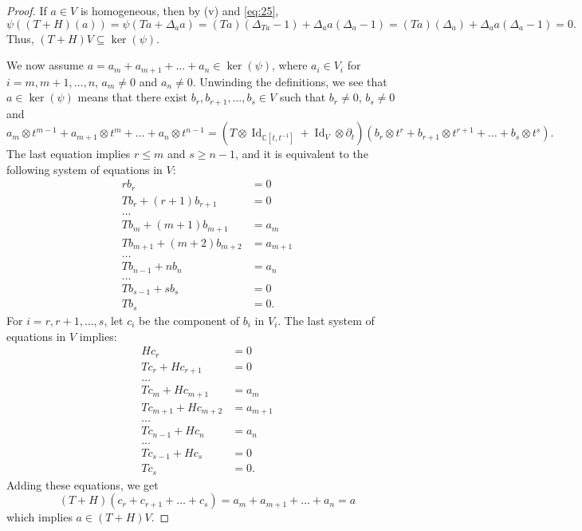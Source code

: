 \documentclass[a4paper, 12pt, reqno]{amsart}
\theoremstyle{remark}
\numberwithin{equation}{subsection}
\DeclareMathOperator{\Id}{Id}
\begin{document}
\begin{proof}
  If $a \in V$ is homogeneous, then by (v) and \eqref{eq:25},
  \begin{equation*}
    \psi((T + H)(a)) = \psi(Ta + \Delta_aa) = (Ta)(\Delta_{Ta} - 1) + \Delta_aa(\Delta_a - 1) = (Ta)(\Delta_a) + \Delta_aa(\Delta_a - 1) = 0.
  \end{equation*}
  Thus, $(T + H)V \subseteq \ker(\psi)$.
  
  We now assume $a = a_m + a_{m + 1} + \dots + a_n \in \ker(\psi)$, where $a_i \in V_i$ for $i = m, m + 1, \dots, n$, $a_m \neq 0$ and $a_n \neq 0$.
  Unwinding the definitions, we see that $a \in \ker(\psi)$ means that there exist $b_r, b_{r + 1}, \dots, b_s \in V$ such that $b_r \neq 0$, $b_s \neq 0$ and 
  \begin{equation*}
    a_m\otimes t^{m - 1} + a_{m + 1}\otimes t^m + \dots + a_n\otimes t^{n - 1} = (T\otimes\Id_{\mathbb{C}[t, t^{-1}]} + \Id_V\otimes\partial_t)(b_r\otimes t^r + b_{r + 1}\otimes t^{r + 1} + \dots + b_s\otimes t^s).
  \end{equation*}
  The last equation implies $r \le m$ and $s \ge n - 1$, and it is equivalent to the following system of equations in $V$:
  \begin{align*}
    rb_r &= 0 \\
    Tb_r + (r + 1)b_{r + 1} &= 0 \\
    \dots \\
    Tb_m + (m + 1)b_{m + 1} &= a_m \\
    Tb_{m + 1} + (m + 2)b_{m + 2} &= a_{m + 1} \\
    \dots \\
    Tb_{n - 1} + nb_n &= a_n \\
    \dots \\
    Tb_{s - 1} + sb_s &= 0 \\
    Tb_s &= 0.
  \end{align*}
  For $i = r, r + 1, \dots, s$, let $c_i$ be the component of $b_i$ in $V_i$.
  The last system of equations in $V$ implies:
  \begin{align*}
    Hc_r &= 0 \\
    Tc_r + Hc_{r + 1} &= 0 \\
    \dots \\
    Tc_m + Hc_{m + 1} &= a_m \\
    Tc_{m + 1} + Hc_{m + 2} &= a_{m + 1} \\
    \dots \\
    Tc_{n - 1} + Hc_n &= a_n \\
    \dots \\
    Tc_{s - 1} + Hc_s &= 0 \\
    Tc_s &= 0.
  \end{align*}
  Adding these equations, we get
  \begin{equation*}
    (T + H)(c_r + c_{r + 1} + \dots + c_s) = a_m + a_{m + 1} + \dots + a_n = a
  \end{equation*}
  which implies $a \in (T + H)V$.
\end{proof}
\end{document}
